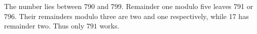 The number lies between 790 and 799. Remainder one modulo five leaves 791 or 796. Their remainders modulo three are two and one respectively, while 17 has remainder two. Thus only $\boxed{791}$ works.
